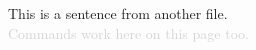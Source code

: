 \begin{center}
This is a sentence from another file.\\ \textcolor{lightgray}{Commands work here on this page too.}
\end{center}
